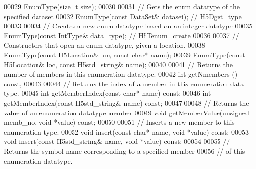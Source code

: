 \begin{DoxyCode}
00029         \hyperlink{class_h5_1_1_enum_type}{EnumType}(\textcolor{keywordtype}{size\_t} size);
00030 
00031         \textcolor{comment}{// Gets the enum datatype of the specified dataset}
00032         \hyperlink{class_h5_1_1_enum_type}{EnumType}(\textcolor{keyword}{const} \hyperlink{class_h5_1_1_data_set}{DataSet}& dataset);  \textcolor{comment}{// H5Dget\_type}
00033 
00034         \textcolor{comment}{// Creates a new enum datatype based on an integer datatype}
00035         \hyperlink{class_h5_1_1_enum_type}{EnumType}(\textcolor{keyword}{const} \hyperlink{class_h5_1_1_int_type}{IntType}& data\_type);  \textcolor{comment}{// H5Tenum\_create}
00036 
00037         \textcolor{comment}{// Constructors that open an enum datatype, given a location.}
00038         \hyperlink{class_h5_1_1_enum_type}{EnumType}(\textcolor{keyword}{const} \hyperlink{class_h5_1_1_h5_location}{H5Location}& loc, \textcolor{keyword}{const} \textcolor{keywordtype}{char}* name);
00039         \hyperlink{class_h5_1_1_enum_type}{EnumType}(\textcolor{keyword}{const} \hyperlink{class_h5_1_1_h5_location}{H5Location}& loc, \textcolor{keyword}{const} H5std\_string& name);
00040 
00041         \textcolor{comment}{// Returns the number of members in this enumeration datatype.}
00042         \textcolor{keywordtype}{int} getNmembers () \textcolor{keyword}{const};
00043 
00044         \textcolor{comment}{// Returns the index of a member in this enumeration data type.}
00045         \textcolor{keywordtype}{int} getMemberIndex(\textcolor{keyword}{const} \textcolor{keywordtype}{char}* name) \textcolor{keyword}{const};
00046         \textcolor{keywordtype}{int} getMemberIndex(\textcolor{keyword}{const} H5std\_string& name) \textcolor{keyword}{const};
00047 
00048         \textcolor{comment}{// Returns the value of an enumeration datatype member}
00049         \textcolor{keywordtype}{void} getMemberValue(\textcolor{keywordtype}{unsigned} memb\_no, \textcolor{keywordtype}{void} *value) \textcolor{keyword}{const};
00050 
00051         \textcolor{comment}{// Inserts a new member to this enumeration type.}
00052         \textcolor{keywordtype}{void} insert(\textcolor{keyword}{const} \textcolor{keywordtype}{char}* name, \textcolor{keywordtype}{void} *value) \textcolor{keyword}{const};
00053         \textcolor{keywordtype}{void} insert(\textcolor{keyword}{const} H5std\_string& name, \textcolor{keywordtype}{void} *value) \textcolor{keyword}{const};
00054 
00055         \textcolor{comment}{// Returns the symbol name corresponding to a specified member}
00056         \textcolor{comment}{// of this enumeration datatype.}

\end{DoxyCode}
